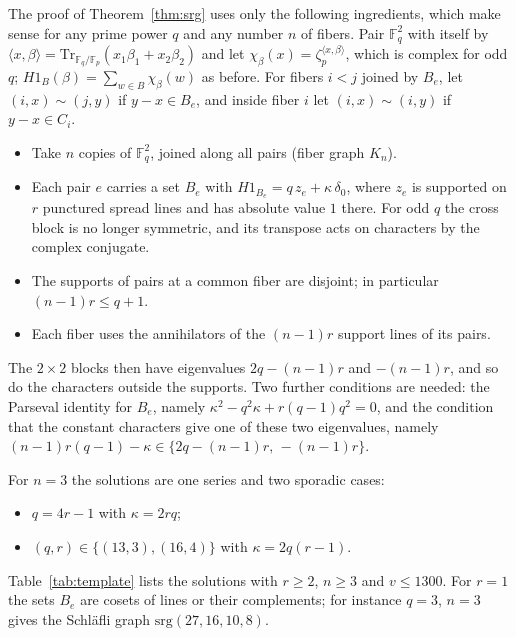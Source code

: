 \documentclass[11pt]{amsart}
\theoremstyle{definition}
\newcommand{\F}{\mathbb{F}}
\newcommand{\srg}{\mathrm{srg}}
\newcommand{\Tr}{\mathrm{Tr}}
\begin{document}
The proof of Theorem~\ref{thm:srg} uses only the following ingredients, which make sense for any prime power $q$ and any number $n$ of fibers. Pair $\F_q^2$ with itself by $\langle x,\beta\rangle=\Tr_{\F_q/\F_p}(x_1\beta_1+x_2\beta_2)$ and let $\chi_\beta(x)=\zeta_p^{\langle x,\beta\rangle}$, which is complex for odd $q$; $H1_B(\beta)=\sum_{w\in B}\chi_\beta(w)$ as before. For fibers $i<j$ joined by $B_e$, let $(i,x)\sim(j,y)$ if $y-x\in B_e$, and inside fiber $i$ let $(i,x)\sim(i,y)$ if $y-x\in C_i$.
\begin{itemize}
\item Take $n$ copies of $\F_q^2$, joined along all pairs (fiber graph $K_n$).
\item Each pair $e$ carries a set $B_e$ with $H1_{B_e}=q\,z_e+\kappa\,\delta_0$, where $z_e$ is supported on $r$ punctured spread lines and has absolute value $1$ there. For odd $q$ the cross block is no longer symmetric, and its transpose acts on characters by the complex conjugate.
\item The supports of pairs at a common fiber are disjoint; in particular $(n-1)r\le q+1$.
\item Each fiber uses the annihilators of the $(n-1)r$ support lines of its pairs.
\end{itemize}
The $2\times2$ blocks then have eigenvalues $2q-(n-1)r$ and $-(n-1)r$, and so do the characters outside the supports. Two further conditions are needed: the Parseval identity for $B_e$, namely $\kappa^2-q^2\kappa+r(q-1)q^2=0$, and the condition that the constant characters give one of these two eigenvalues, namely $(n-1)r(q-1)-\kappa\in\{2q-(n-1)r,\,-(n-1)r\}$.

For $n=3$ the solutions are one series and two sporadic cases:
\begin{itemize}
\item $q=4r-1$ with $\kappa=2rq$;
\item $(q,r)\in\{(13,3),(16,4)\}$ with $\kappa=2q(r-1)$.
\end{itemize}
Table~\ref{tab:template} lists the solutions with $r\ge2$, $n\ge3$ and $v\le1300$. For $r=1$ the sets $B_e$ are cosets of lines or their complements; for instance $q=3$, $n=3$ gives the Schl\"afli graph $\srg(27,16,10,8)$.
\end{document}
